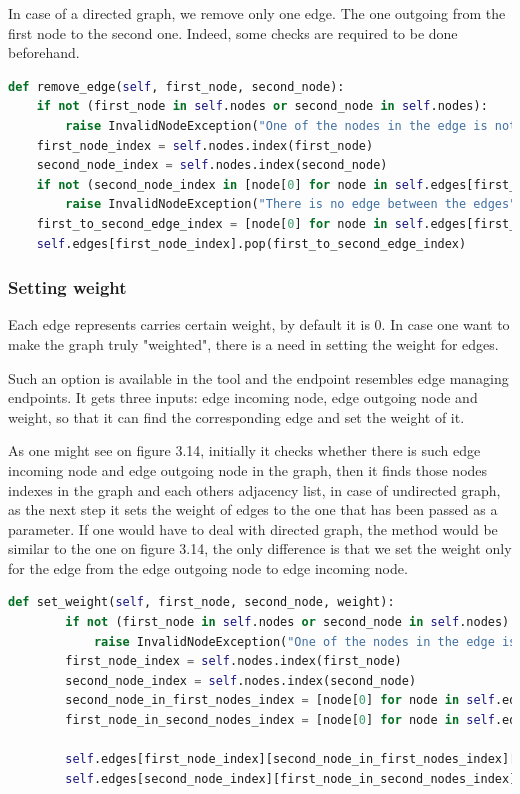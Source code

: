 In case of a directed graph, we remove only one edge. The one outgoing from the first node to the second one. Indeed, some checks are required to be done beforehand.

\begin{lstlisting}[language={python}]
    def remove_edge(self, first_node, second_node):
	if not (first_node in self.nodes or second_node in self.nodes):
		raise InvalidNodeException("One of the nodes in the edge is not in the nodes set.")
	first_node_index = self.nodes.index(first_node)
	second_node_index = self.nodes.index(second_node)
	if not (second_node_index in [node[0] for node in self.edges[first_node_index]]):
		raise InvalidNodeException("There is no edge between the edges")
	first_to_second_edge_index = [node[0] for node in self.edges[first_node_index]].index(second_node_index)
	self.edges[first_node_index].pop(first_to_second_edge_index)
\end{lstlisting}

\subsubsection{Setting weight}

Each edge represents carries certain weight, by default it is 0. In case one want to make the graph truly "weighted", there is a need in setting the weight for edges.

Such an option is available in the tool and the endpoint resembles edge managing endpoints. It gets three inputs: edge incoming node, edge outgoing node and weight, so that it can find the corresponding edge and set the weight of it.

As one might see on figure 3.14, initially it checks whether there is such edge incoming node and edge outgoing node in the graph, then it finds those nodes indexes in the graph and each others adjacency list, in case of undirected graph, as the next step it sets the weight of edges to the one that has been passed as a parameter. If one would have to deal with directed graph, the method would be similar to the one on figure 3.14, the only difference is that we set the weight only for the edge from the edge outgoing node to edge incoming node.

\begin{lstlisting}[language={python}]
 	def set_weight(self, first_node, second_node, weight):
		if not (first_node in self.nodes or second_node in self.nodes):
			raise InvalidNodeException("One of the nodes in the edge is not in the nodes set.")
		first_node_index = self.nodes.index(first_node)
		second_node_index = self.nodes.index(second_node)
		second_node_in_first_nodes_index = [node[0] for node in self.edges[first_node_index]].index(second_node_index)
		first_node_in_second_nodes_index = [node[0] for node in self.edges[second_node_index]].index(first_node_index)
		
		self.edges[first_node_index][second_node_in_first_nodes_index][1] = weight
		self.edges[second_node_index][first_node_in_second_nodes_index][1] = weight
\end{lstlisting}

